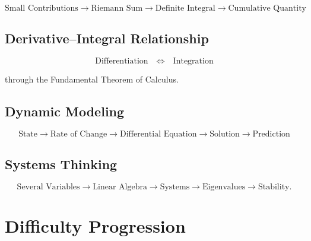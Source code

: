 \documentclass[11pt]{article}
\begin{document}
\[
\text{Small Contributions}
\rightarrow
\text{Riemann Sum}
\rightarrow
\text{Definite Integral}
\rightarrow
\text{Cumulative Quantity}
\]

\subsection{Derivative--Integral Relationship}

\[
\boxed{
\text{Differentiation}
\quad\Longleftrightarrow\quad
\text{Integration}
}
\]

through the Fundamental Theorem of Calculus.

\subsection{Dynamic Modeling}

\[
\text{State}
\rightarrow
\text{Rate of Change}
\rightarrow
\text{Differential Equation}
\rightarrow
\text{Solution}
\rightarrow
\text{Prediction}
\]

\subsection{Systems Thinking}

\[
\text{Several Variables}
\rightarrow
\text{Linear Algebra}
\rightarrow
\text{Systems}
\rightarrow
\text{Eigenvalues}
\rightarrow
\text{Stability}.
\]


\section{Difficulty Progression}
\end{document}
